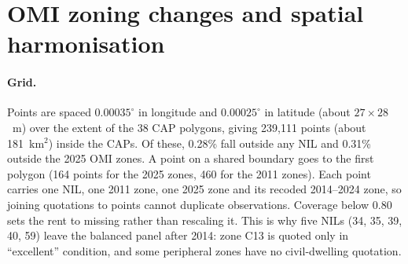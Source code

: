 \appendix

\section{OMI zoning changes and spatial harmonisation}\label{app:omi}

\paragraph{Grid.} Points are spaced $0.00035^\circ$ in longitude and
$0.00025^\circ$ in latitude (about $27\times28$~m) over the extent of the 38
CAP polygons, giving 239,111 points (about 181~km$^2$) inside the CAPs. Of
these, 0.28\% fall outside any NIL and 0.31\% outside the 2025 OMI zones. A
point on a shared boundary goes to the first polygon (164 points for the 2025
zones, 460 for the 2011 zones). Each point carries one NIL, one 2011 zone, one
2025 zone and its recoded 2014--2024 zone, so joining quotations to points
cannot duplicate observations. Coverage below 0.80 sets the rent to missing
rather than rescaling it. This is why five NILs (34, 35, 39, 40, 59) leave
the balanced panel after 2014: zone C13 is quoted only in ``excellent''
condition, and some peripheral zones have no civil-dwelling quotation.

